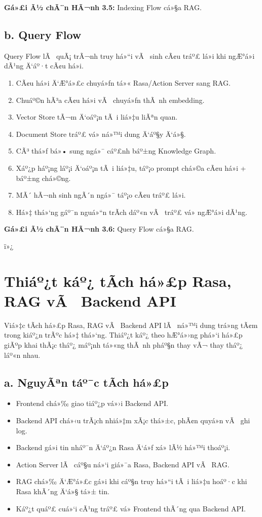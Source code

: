 ﻿\documentclass[12pt,a4paper]{report}
\begin{document}
\textbf{Gá»£i Ã½ chÃ¨n HÃ¬nh 3.5:} Indexing Flow cá»§a RAG.

\subsection*{b. Query Flow}

Query Flow lÃ  quÃ¡ trÃ¬nh truy há»“i vÃ  sinh cÃ¢u tráº£ lá»i khi ngÆ°á»i dÃ¹ng Ä‘áº·t cÃ¢u há»i.
\begin{enumerate}
    \item CÃ¢u há»i Ä‘Æ°á»£c chuyá»ƒn tá»« Rasa/Action Server sang RAG.
    \item Chuáº©n hÃ³a cÃ¢u há»i vÃ  chuyá»ƒn thÃ nh embedding.
    \item Vector Store tÃ¬m Ä‘oáº¡n tÃ i liá»‡u liÃªn quan.
    \item Document Store tráº£ vá» ná»™i dung Ä‘áº§y Ä‘á»§.
    \item CÃ³ thá»ƒ bá»• sung ngá»¯ cáº£nh báº±ng Knowledge Graph.
    \item Xáº¿p háº¡ng láº¡i Ä‘oáº¡n tÃ i liá»‡u, táº¡o prompt chá»©a cÃ¢u há»i + báº±ng chá»©ng.
    \item MÃ´ hÃ¬nh sinh ngÃ´n ngá»¯ táº¡o cÃ¢u tráº£ lá»i.
    \item Há»‡ thá»‘ng gáº¯n nguá»“n trÃ­ch dáº«n vÃ  tráº£ vá» ngÆ°á»i dÃ¹ng.
\end{enumerate}

\textbf{Gá»£i Ã½ chÃ¨n HÃ¬nh 3.6:} Query Flow cá»§a RAG.



ï»¿\section{Thiáº¿t káº¿ tÃ­ch há»£p Rasa, RAG vÃ  Backend API}

Viá»‡c tÃ­ch há»£p Rasa, RAG vÃ  Backend API lÃ  ná»™i dung trá»ng tÃ¢m trong kiáº¿n trÃºc há»‡ thá»‘ng. Thiáº¿t káº¿ theo hÆ°á»›ng phá»‘i há»£p giÃºp khai thÃ¡c tháº¿ máº¡nh tá»«ng thÃ nh pháº§n thay vÃ¬ thay tháº¿ láº«n nhau.

\subsection*{a. NguyÃªn táº¯c tÃ­ch há»£p}

\begin{itemize}
    \item Frontend chá»‰ giao tiáº¿p vá»›i Backend API.
    \item Backend API chá»‹u trÃ¡ch nhiá»‡m xÃ¡c thá»±c, phÃ¢n quyá»n vÃ  ghi log.
    \item Backend gá»­i tin nháº¯n Ä‘áº¿n Rasa Ä‘á»ƒ xá»­ lÃ½ há»™i thoáº¡i.
    \item Action Server lÃ  cáº§u ná»‘i giá»¯a Rasa, Backend API vÃ  RAG.
    \item RAG chá»‰ Ä‘Æ°á»£c gá»i khi cáº§n truy há»“i tÃ i liá»‡u hoáº·c khi Rasa khÃ´ng Ä‘á»§ tá»± tin.
    \item Káº¿t quáº£ cuá»‘i cÃ¹ng tráº£ vá» Frontend thÃ´ng qua Backend API.
\end{itemize}
\end{document}
